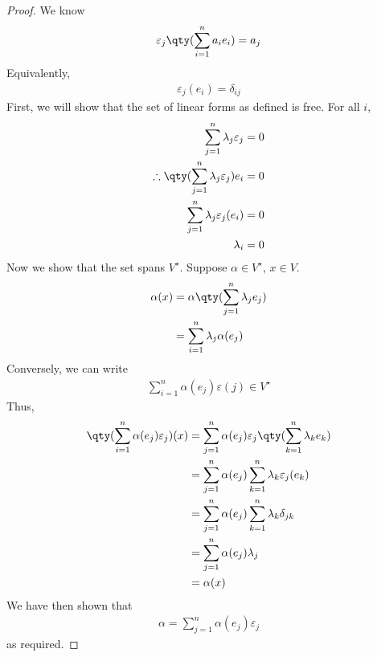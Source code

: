 \begin{proof}
	We know
	\begin{align*}
		\varepsilon_j \qty( \sum_{i=1}^n a_i e_i ) = a_j
	\end{align*}
	Equivalently,
	\begin{align*}
		\varepsilon_j (e_i) = \delta_{ij}
	\end{align*}
	First, we will show that the set of linear forms as defined is free.
	For all $i$,
	\begin{align*}
		\sum_{j=1}^n \lambda_j \varepsilon_j                        & = 0 \\
		\therefore \qty( \sum_{j=1}^n \lambda_j \varepsilon_j ) e_i & = 0 \\
		\sum_{j=1}^n \lambda_j \varepsilon_j(e_i)                   & = 0 \\
		\lambda_i                                                   & = 0
	\end{align*}
	Now we show that the set spans $V^\star$.
	Suppose $\alpha \in V^\star$, $x \in V$.
	\begin{align*}
		\alpha(x) & = \alpha\qty(\sum_{j=1}^n \lambda_j e_j) \\
		          & = \sum_{i=1}^n \lambda_j \alpha(e_j)
	\end{align*}
	Conversely, we can write
	\begin{align*}
		\sum_{i=1}^n \alpha(e_j) \varepsilon(j) \in V^\star
	\end{align*}
	Thus,
	\begin{align*}
		\qty( \sum_{i=1}^n \alpha(e_j) \varepsilon_j) (x) & = \sum_{j=1}^n \alpha(e_j) \varepsilon_j\qty(\sum_{k=1}^n \lambda_k e_k) \\
		                                                  & = \sum_{j=1}^n \alpha(e_j) \sum_{k=1}^n \lambda_k \varepsilon_j(e_k)     \\
		                                                  & = \sum_{j=1}^n \alpha(e_j) \sum_{k=1}^n \lambda_k \delta_{jk}            \\
		                                                  & = \sum_{j=1}^n \alpha(e_j) \lambda_j                                     \\
		                                                  & = \alpha(x)
	\end{align*}
	We have then shown that
	\begin{align*}
		\alpha = \sum_{j=1}^n \alpha(e_j) \varepsilon_j
	\end{align*}
	as required.
\end{proof}
